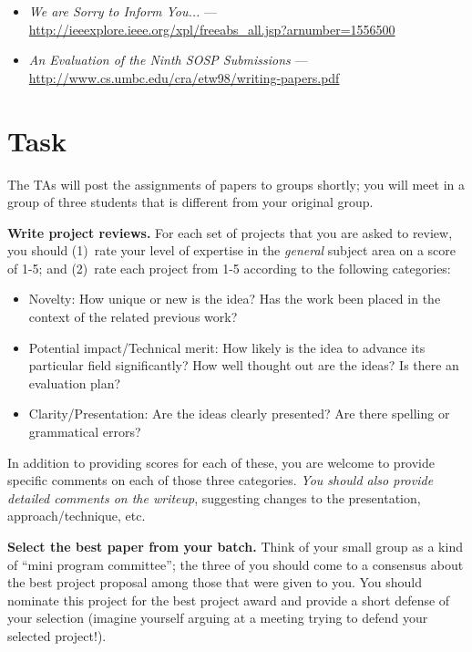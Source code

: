 \documentclass[11pt]{article}
\begin{document}
\begin{itemize}
\itemsep=-1pt
\item {\em We are Sorry to Inform You...} --- \\
  \url{http://ieeexplore.ieee.org/xpl/freeabs_all.jsp?arnumber=1556500}
\item {\em An Evaluation of the Ninth SOSP Submissions} --- \\
  \url{http://www.cs.umbc.edu/cra/etw98/writing-papers.pdf}
\end{itemize}

\section{Task}


The TAs will post the assignments of papers to groups shortly; you will
meet in a group of three students that is different from your original
group.  

{\bf Write project reviews.}
For each set of projects that you are asked to review, you
should (1)~rate your level of expertise in the {\em general} subject
area on a score of 1-5; and (2)~rate each project from 1-5 according to
the following categories:

\begin{itemize}
\itemsep=-1pt
\item Novelty: How unique or new is the idea?  Has the work been placed
  in the context of the related previous work?
\item Potential impact/Technical merit: How likely is the idea to
  advance its particular field significantly?  How well thought out are
  the ideas?  Is there an evaluation plan?
\item Clarity/Presentation: Are the ideas clearly presented?  Are there
  spelling or grammatical errors?
\end{itemize}

In addition to providing scores for each of these, you are welcome to
provide specific comments on each of those three categories.  {\em You
  should also provide detailed comments on the writeup}, suggesting
changes to the presentation, approach/technique, etc.

{\bf Select the best paper from your batch.}  
Think of your small group as a kind of ``mini program committee''; the
three of you should come to a consensus about the best project proposal
among those that were given to you.  You should nominate this project
for the best project award and provide a short defense of your selection
(imagine yourself arguing at a meeting trying to defend your selected
project!).
\end{document}
